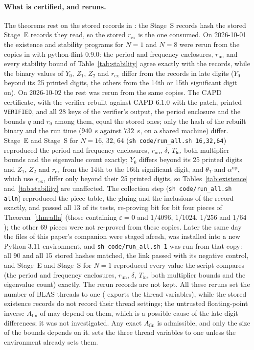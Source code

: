 \documentclass[11pt]{article}
\theoremstyle{definition}
\begin{document}
\paragraph{What is certified, and reruns.} The theorems rest on the stored records in : the Stage~S records hash the stored Stage~E records they read, so the stored $r_{\mathrm{ex}}$ is the one consumed. On 2026-10-01 the existence and stability programs for $N = 1$ and $N = 8$ were rerun from the copies in  with python-flint 0.9.0: the period and frequency enclosures, $r_{\mathrm{un}}$ and every stability bound of Table~\ref{tab:stability} agree exactly with the records, while the binary values of $Y_0$, $Z_1$, $Z_2$ and $r_{\mathrm{ex}}$ differ from the records in late digits ($Y_0$ beyond its 25 printed digits, the others from the 14th or 15th significant digit on). On 2026-10-02 the rest was rerun from the same copies. The CAPD certificate, with the verifier rebuilt against CAPD 6.1.0 with the patch, printed \texttt{VERIFIED}, and all 28 keys of the verifier's output, the period enclosure and the bounds $q$ and $r_0$ among them, equal the stored ones; only the hash of the rebuilt binary and the run time ($940$~s against $732$~s, on a shared machine) differ. Stage~E and Stage~S for $N = 16$, $32$, $64$ (\texttt{sh code/run\_all.sh 16,32,64}) reproduced the period and frequency enclosures, $r_{\mathrm{un}}$, $\delta$, $T_{\mathrm{lo}}$, both multiplier bounds and the eigenvalue count exactly; $Y_0$ differs beyond its 25 printed digits and $Z_1$, $Z_2$ and $r_{\mathrm{ex}}$ from the 14th to the 16th significant digit, and $\theta_T$ and $\alpha^{\mathrm{up}}$, which use $r_{\mathrm{ex}}$, differ only beyond their 25 printed digits, so Tables~\ref{tab:existence} and~\ref{tab:stability} are unaffected. The collection step (\texttt{sh code/run\_all.sh alln}) reproduced the piece table, the gluing and the inclusions of the record exactly, and  passed all 13 of its tests, re-proving bit for bit four pieces of Theorem~\ref{thm:alln} (those containing $\varepsilon = 0$ and $1/4096$, $1/1024$, $1/256$ and $1/64$); the other 69 pieces were not re-proved from these copies. Later the same day the files of this paper's companion were staged afresh,  was installed into a new Python 3.11 environment, and \texttt{sh code/run\_all.sh 1} was run from that copy: all 90 and all 15 stored hashes matched, the link passed with its negative control, and Stage~E and Stage~S for $N = 1$ reproduced every value the script compares (the period and frequency enclosures, $r_{\mathrm{un}}$, $\delta$, $T_{\mathrm{lo}}$, both multiplier bounds and the eigenvalue count) exactly. The rerun records are not kept. All these reruns set the number of BLAS threads to one ( exports the thread variables), while the stored existence records do not record their thread settings; the untrusted floating-point inverse $A_{\mathrm{fin}}$ of  may depend on them, which is a possible cause of the late-digit differences; it was not investigated. Any exact $A_{\mathrm{fin}}$ is admissible, and only the size of the bounds depends on it.  sets the three thread variables to one unless the environment already sets them.
\end{document}
